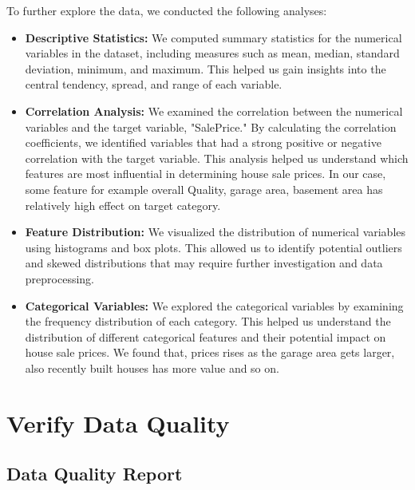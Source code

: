 To further explore the data, we conducted the following analyses:
\begin{itemize}
    \item \textbf{Descriptive Statistics:} We computed summary statistics for the numerical variables in the dataset, including measures such as mean, median, standard deviation, minimum, and maximum. This helped us gain insights into the central tendency, spread, and range of each variable.
    \item \textbf{Correlation Analysis:} We examined the correlation between the numerical variables and the target variable, "SalePrice." By calculating the correlation coefficients, we identified variables that had a strong positive or negative correlation with the target variable. This analysis helped us understand which features are most influential in determining house sale prices. In our case, some feature for example overall Quality, garage area, basement area has relatively high effect on target category.
    \item \textbf{Feature Distribution:} We visualized the distribution of numerical variables using histograms and box plots. This allowed us to identify potential outliers and skewed distributions that may require further investigation and data preprocessing. 
    \item \textbf{Categorical Variables:} We explored the categorical variables by examining the frequency distribution of each category. This helped us understand the distribution of different categorical features and their potential impact on house sale prices. We found that, prices rises as the garage area gets larger, also recently built houses has more value and so on. 
\end{itemize}

\section{Verify Data Quality}

\subsection{Data Quality Report}

